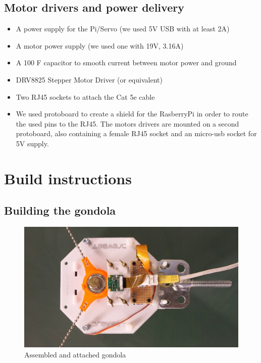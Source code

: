\documentclass[a4paper,10pt]{article}
\begin{document}
\subsection*{Motor drivers and power delivery}
\begin{itemize}
  \item A power supply for the Pi/Servo (we used 5V USB with at least 2A)
  \item A motor power supply (we used one with 19V, 3.16A)
  \item A 100 \textmu F capacitor to smooth current between motor power and ground
  \item DRV8825 Stepper Motor Driver (or equivalent)
  \item Two RJ45 sockets to attach the Cat 5e cable
  \item We used protoboard to create a shield for the RasberryPi in order to route the used pins to the RJ45. The motors drivers are mounted on a second protoboard, also containing a female RJ45 socket and an micro-usb socket for 5V supply.
\end{itemize}

\section{Build instructions}
\label{sec:buildinst}

\subsection{Building the gondola}

\begin{figure}[h!]
  \centering
  \includegraphics{img/gondola.jpg}
  \caption{Assembled and attached gondola}
  \label{fig:gondola}
\end{figure}
\end{document}
